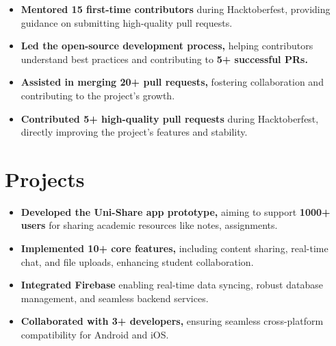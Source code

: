 \documentclass[]{deedy-resume-openfont}
\begin{document}
\begin{minipage}[t]{0.66\textwidth}
\vspace{\topsep} 
\begin{itemize}[leftmargin=*]
    \item \textbf{Mentored 15 first-time contributors} during Hacktoberfest, providing guidance on submitting high-quality pull requests.
    \vspace{-2.6mm} %
    \item \textbf{Led the open-source development process,} helping contributors understand best practices and contributing to \textbf{5+ successful PRs.}
    \vspace{-2.6mm}
    \item \textbf{Assisted in merging 20+ pull requests,} fostering collaboration and contributing to the project's growth.
    \vspace{-2.6mm}
    \item \textbf{Contributed 5+ high-quality pull requests} during Hacktoberfest, directly improving the project's features and stability.
\end{itemize}
\sectionsep

\section{Projects}
\vspace{\topsep} 
\begin{itemize}[leftmargin=*]
    \item \textbf{Developed the Uni-Share app prototype,} aiming to support \textbf {1000+ users} for sharing academic resources like notes, assignments.
    \vspace{-2.6mm} %
    \item \textbf{Implemented 10+ core features,} including content sharing, real-time chat, and file uploads, enhancing student collaboration.
    \vspace{-2.6mm}
    \item \textbf{Integrated Firebase} enabling real-time data syncing, robust database management, and seamless backend services.
    \vspace{-2.6mm}
    \item \textbf{Collaborated with 3+ developers,} ensuring seamless cross-platform compatibility for Android and iOS.
\end{itemize}
\sectionsep


\end{minipage}
\end{document}
